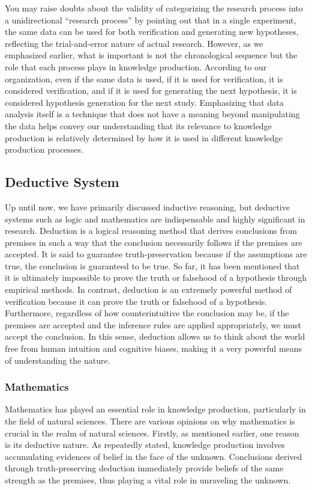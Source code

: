 You may raise doubts about the validity of categorizing the research process into a unidirectional ``research process'' by pointing out that in a single experiment, the same data can be used for both verification and generating new hypotheses, reflecting the trial-and-error nature of actual research. However, as we emphasized earlier, what is important is not the chronological sequence but the role that each process plays in knowledge production. According to our organization, even if the same data is used, if it is used for verification, it is considered verification, and if it is used for generating the next hypothesis, it is considered hypothesis generation for the next study. Emphasizing that data analysis itself is a technique that does not have a meaning beyond manipulating the data helps convey our understanding that its relevance to knowledge production is relatively determined by how it is used in different knowledge production processes.

\subsection{Deductive System}
Up until now, we have primarily discussed inductive reasoning, but deductive systems such as logic and mathematics are indispensable and highly significant in research. Deduction is a logical reasoning method that derives conclusions from premises in such a way that the conclusion necessarily follows if the premises are accepted. It is said to guarantee truth-preservation because if the assumptions are true, the conclusion is guaranteed to be true. So far, it has been mentioned that it is ultimately impossible to prove the truth or falsehood of a hypothesis through empirical methods. In contrast, deduction is an extremely powerful method of verification because it can prove the truth or falsehood of a hypothesis. Furthermore, regardless of how counterintuitive the conclusion may be, if the premises are accepted and the inference rules are applied appropriately, we must accept the conclusion. In this sense, deduction allows us to think about the world free from human intuition and cognitive biases, making it a very powerful means of understanding the nature.

\subsubsection{Mathematics}
Mathematics has played an essential role in knowledge production, particularly in the field of natural sciences. There are various opinions on why mathematics is crucial in the realm of natural sciences. Firstly, as mentioned earlier, one reason is its deductive nature. As repeatedly stated, knowledge production involves accumulating evidences of belief in the face of the unknown. Conclusions derived through truth-preserving deduction immediately provide beliefs of the same strength as the premises, thus playing a vital role in unraveling the unknown. 

